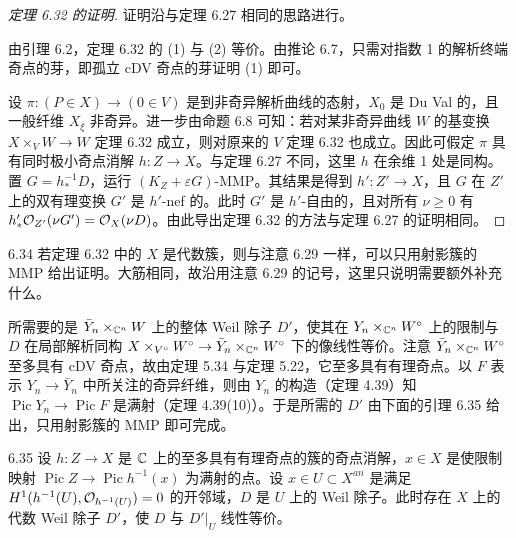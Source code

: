 \begin{proof}[定理 6.32 的证明]
证明沿与定理 6.27 相同的思路进行。

由引理 6.2，定理 6.32 的 (1) 与 (2) 等价。由推论 6.7，只需对指数 1 的解析终端奇点的芽，即孤立 cDV 奇点的芽证明 (1) 即可。

设 $\pi:(P\in X)\to(0\in V)$ 是到非奇异解析曲线的态射，$X_0$ 是 Du Val 的，且一般纤维 $X_\xi$ 非奇异。进一步由命题 6.8 可知：若对某非奇异曲线 $W$ 的基变换 $X\times_V W\to W$ 定理 6.32 成立，则对原来的 $V$ 定理 6.32 也成立。因此可假定 $\pi$ 具有同时极小奇点消解 $h:Z\to X$。与定理 6.27 不同，这里 $h$ 在余维 1 处是同构。置 $G=h_*^{-1}D$，运行 $(K_Z+\varepsilon G)$-MMP。其结果是得到 $h':Z'\to X$，且 $G$ 在 $Z'$ 上的双有理变换 $G'$ 是 $h'$-nef 的。此时 $G'$ 是 $h'$-自由的，且对所有 $\nu\ge0$ 有 $h'_*\mathcal{O}_{Z'}(\nu G')=\mathcal{O}_X(\nu D)$。由此导出定理 6.32 的方法与定理 6.27 的证明相同。
\end{proof}


\begin{remark}{6.34}
若定理 6.32 中的 $X$ 是代数簇，则与注意 6.29 一样，可以只用射影簇的 MMP 给出证明。大筋相同，故沿用注意 6.29 的记号，这里只说明需要额外补充什么。

所需要的是 $\bar Y_n\times_{\mathbb{C}^n}W$ 上的整体 Weil 除子 $D'$，使其在 $Y_n\times_{\mathbb{C}^n}W^\circ$ 上的限制与 $D$ 在局部解析同构 $X\times_{V^\circ}W^\circ\to\bar Y_n\times_{\mathbb{C}^n}W^\circ$ 下的像线性等价。注意 $\bar Y_n\times_{\mathbb{C}^n}W^\circ$ 至多具有 cDV 奇点，故由定理 5.34 与定理 5.22，它至多具有有理奇点。以 $F$ 表示 $Y_n\to\bar Y_n$ 中所关注的奇异纤维，则由 $Y_n$ 的构造（定理 4.39）知 $\operatorname{Pic}Y_n\to\operatorname{Pic}F$ 是满射（定理 4.39(10)）。于是所需的 $D'$ 由下面的引理 6.35 给出，只用射影簇的 MMP 即可完成。
\end{remark}

\begin{lemmap}{6.35}
设 $h:Z\to X$ 是 $\mathbb{C}$ 上的至多具有有理奇点的簇的奇点消解，$x\in X$ 是使限制映射 $\operatorname{Pic}Z\to\operatorname{Pic}h^{-1}(x)$ 为满射的点。设 $x\in U\subset X^{an}$ 是满足 $H^1(h^{-1}(U),\mathcal{O}_{h^{-1}(U)})=0$ 的开邻域，$D$ 是 $U$ 上的 Weil 除子。此时存在 $X$ 上的代数 Weil 除子 $D'$，使 $D$ 与 $D'|_U$ 线性等价。
\end{lemmap}

